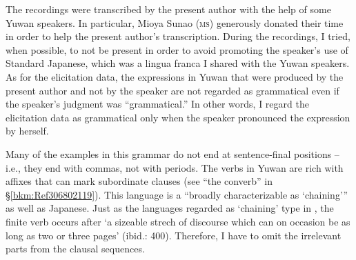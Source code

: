 \begin{table}
\caption{\label{tab:key:3}Information about the Yuwan speakers}
\end{table}


The recordings were transcribed by the present author with the help of some Yuwan speakers. In particular, Mioya Sunao (\textsc{ms}) generously donated their time in order to help the present author’s transcription. During the recordings, I tried, when possible, to not be present in order to avoid promoting the speaker’s use of Standard Japanese, which was a lingua franca I shared with the Yuwan speakers. As for the elicitation data, the expressions in Yuwan that were produced by the present author and not by the speaker are not regarded as grammatical even if the speaker’s judgment was “grammatical.” In other words, I regard the elicitation data as grammatical only when the speaker pronounced the expression by herself.

Many of the examples in this grammar do not end at sentence-final positions -- i.e., they end with commas, not with periods. The verbs in Yuwan are rich with affixes that can mark subordinate clauses (see “the converb” in §\ref{bkm:Ref306802119}). This language is a “broadly characterizable as ‘chaining’” \citep[399]{Longacre2007} as well as Japanese. Just as the languages regarded as ‘chaining’ type in \citet{Longacre2007}, the finite verb occurs after ‘a sizeable strech of discourse which can on occasion be as long as two or three pages’ (ibid.: 400). Therefore, I have to omit the irrelevant parts from the clausal sequences.

